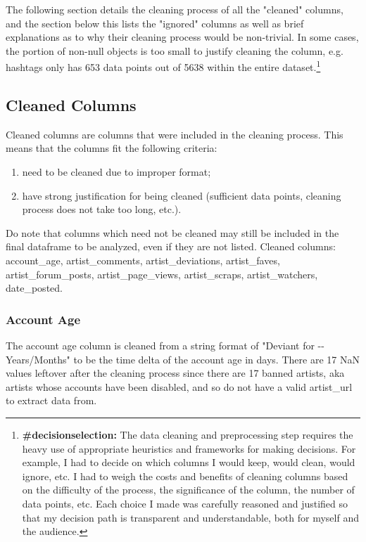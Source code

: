 \documentclass[11pt]{article}
\begin{document}
The following section details the cleaning process of all the "cleaned"
columns, and the section below this lists the "ignored" columns as well
as brief explanations as to why their cleaning process would be
non-trivial. In some cases, the portion of non-null objects is too small
to justify cleaning the column, e.g. hashtags only has 653 data points
out of 5638 within the entire dataset.\footnote{\textbf{\#decisionselection:} The data cleaning and preprocessing step requires the heavy use of appropriate heuristics and frameworks for making decisions. For example, I had to decide on which columns I would keep, would clean, would ignore, etc. I had to weigh the costs and benefits of cleaning columns based on the difficulty of the process, the significance of the column, the number of data points, etc. Each choice I made was carefully reasoned and justified so that my decision path is transparent and understandable, both for myself and the audience.}

\subsection{Cleaned Columns}

Cleaned columns are columns that were included in the cleaning process.
This means that the columns fit the following criteria:

\begin{enumerate}
\def\labelenumi{\alph{enumi})}
\item
  need to be cleaned due to improper format;
\item
  have strong justification for being cleaned (sufficient data points,
  cleaning process does not take too long, etc.).
\end{enumerate}

Do note that columns which need not be cleaned may still be included in
the final dataframe to be analyzed, even if they are not listed. Cleaned columns: account\_age, artist\_comments, artist\_deviations, artist\_faves, artist\_forum\_posts, artist\_page\_views, artist\_scraps, artist\_watchers, date\_posted.

   \subsubsection{Account Age}

The account age column is cleaned from a string format of "Deviant for
-\/- Years/Months" to be the time delta of the account age in days.
There are 17 NaN values leftover after the cleaning process since there
are 17 banned artists, aka artists whose accounts have been disabled,
and so do not have a valid artist\_url to extract data from.
\end{document}
